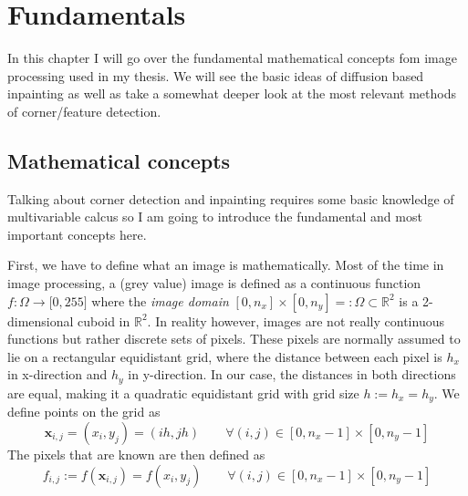 \chapter{Fundamentals} 

\label{Fundamentals}

In this chapter I will go over the fundamental mathematical concepts fom image processing used in
my thesis. We will see the basic ideas of diffusion based inpainting as well as take a somewhat
deeper look at the most relevant methods of corner/feature detection.

\section{Mathematical concepts}

Talking about corner detection and inpainting requires some basic knowledge of multivariable calcus
so I am going to introduce the fundamental and most important concepts here.

First, we have to define what an image is mathematically. Most of the time in image processing, a (grey value) image
is defined as a continuous function
$f:\Omega\rightarrow\lbrack0,255\rbrack$ where the \textit{image domain} $[0, n_x] \times
[0, n_y] =: \Omega \subset \mathbb{R}^2$ is a 2-dimensional cuboid in $\mathbb{R}^2$.
In reality however, images are not really continuous functions but rather discrete sets of pixels.
These pixels are normally assumed to lie on a rectangular equidistant grid, where the distance
between each pixel is $h_x$ in x-direction and $h_y$ in y-direction. 
In our case, the distances in both directions are equal, making it a quadratic equidistant grid
with grid size $h := h_x = h_y$.
We define points on the grid as
\begin{equation}
    \mathbf{x}_{i, j} = (x_i, y_j) = (ih, jh)\qquad \forall (i, j) \in [0, n_x-1] \times [0, n_y-1] 
\end{equation}
The pixels that are known are then defined as
\begin{equation}\label{eq:Disc}
    f_{i, j} := f(\mathbf{x}_{i, j}) = f(x_i, y_j)\qquad \forall (i, j) \in [0, n_x-1] \times [0, n_y-1] 
\end{equation}

